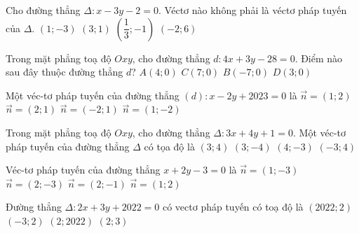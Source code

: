 \begin{ex}%
	Cho đường thẳng $\Delta\colon x-3y-2=0$. Véctơ nào không  phải là véctơ pháp tuyến của $\Delta$.
	\choice 
		 {$(1;-3)$}
		{\True $(3;1)$} 
		 {$\left(\dfrac{1}{3};-1\right)$}
		 {$(-2;6)$}
\end{ex}

\begin{ex}%
	Trong mặt phẳng  toạ độ $Oxy$, cho đường thẳng $d\colon 4x+3y-28=0$. Điểm nào sau đây thuộc đường thẳng $d$?
	\choice 
		 {$A(4; 0)$}
		{\True $C(7; 0)$} 
		{$B(-7;  0)$}
		{$D(3; 0)$} 
\end{ex}

\begin{ex}%
	Một  véc-tơ pháp tuyến của đường thẳng $(d)\colon x-2 y+2023=0$ là
	 \choice
		{$\overrightarrow{n}=(1;2)$} 
		{$\overrightarrow{n}=(2;1)$} 
		 {$\overrightarrow{n}=(-2;1)$}
		 {\True $\overrightarrow{n}=(1;-2)$}
\end{ex}

\begin{ex}%
	Trong  mặt phẳng toạ độ $Oxy$, cho đường thẳng $\Delta\colon 3x+4y+1=0$. Một véc-tơ pháp tuyến của đường thẳng $\Delta$ có tọa độ là
	\choice 
		{\True  $(3; 4)$}
		{$(3;  -4)$}
		 {$(4; -3)$}
		{$(-3;  4)$}
\end{ex}

\begin{ex}%
	Véc-tơ pháp tuyến của đường thẳng $x+2y-3=0$ là 
	\choice 
		{$\overrightarrow{n}=(1;-3)$} 
		{$\overrightarrow{n}=(2;-3)$} 
		 {$\overrightarrow{n}=(2;-1)$}
		{\True  $\overrightarrow{n}=(1;2)$}
\end{ex}

\begin{ex}%
	Đường thẳng $\Delta\colon 2x+3y+2022=0$ có vectơ pháp tuyến  có toạ độ là
	 \choice
		{$\left(2022;2\right)$} 
		{$\left(-3;2\right)$} 
		{$\left(2;2022\right)$} 
		{\True  $\left(2;3\right)$}
\end{ex}

